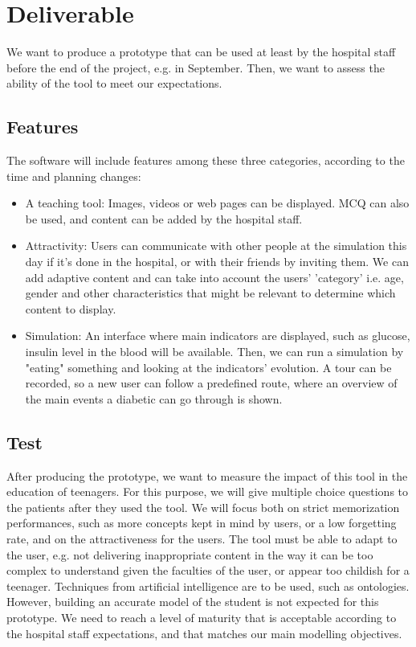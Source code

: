 \documentclass[12pt,MSc]{muthesis}
\begin{document}
\section{Deliverable}
We want to produce a prototype that can be used at least by the hospital staff before the end of the project, e.g. in September. 
Then, we want to assess the ability of the tool to meet our expectations.


\subsection{Features}
The software will include features among these three categories, according to the time and planning changes:

\begin{itemize}
\item A teaching tool:
Images, videos or web pages can be displayed.
MCQ can also be used, and content can be added by the hospital staff.

\item Attractivity:
Users can communicate with other people at the simulation this day if it's done in the hospital, or with their friends by inviting them.
We can add adaptive content and can take into account the users' 'category' i.e. age, gender and other characteristics that might be relevant to determine which content to display.

\item Simulation:
An interface where main indicators are displayed, such as glucose, insulin level in the blood will be available. Then, we can run a simulation by "eating" something and looking at the indicators' evolution. 
A tour can be recorded, so a new user can follow a predefined route, where an overview of the main events a diabetic can go through is shown.

\end{itemize}

\subsection{Test}
After producing the prototype, we want to measure the impact of this tool in the education of teenagers. For this purpose, we will give multiple choice questions to the patients after they used the tool.
We will focus both on strict memorization performances, such as more concepts kept in mind by users, or a low forgetting rate, and on the attractiveness for the users. The tool must be able to adapt to the user, e.g. not delivering inappropriate content in the way it can be too complex to understand given the faculties of the user, or appear too childish for a teenager. Techniques from artificial intelligence are to be used, such as ontologies. However, building an accurate model of the student is not expected for this prototype. We need to reach a level of maturity that is acceptable according to the hospital staff expectations, and that matches our main modelling objectives.
\end{document}

